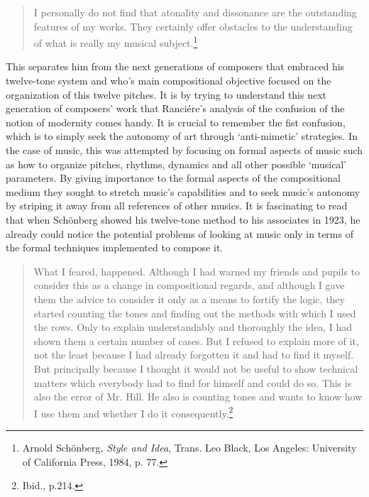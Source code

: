 \begin{quote}
I personally do not find that atonality and dissonance are the outstanding features of my works. They certainly offer obstacles to the understanding of what is really my musical subject.\footnote{Arnold Sch\"{o}nberg, \emph{Style and Idea}, Trans. Leo Black, Los Angeles: University of California Press, 1984, p. 77.}
\end{quote}
This separates him from the next generations of composers that embraced his twelve-tone system and who's main compositional objective focused on the organization of this twelve pitches. It is by trying to understand this next generation of composers' work that Ranci\'{e}re's analysis of the confusion of the notion of modernity comes handy. It is crucial to remember the fist confusion, which is to simply seek the autonomy of art through `anti-mimetic' strategies. In the case of music, this was attempted by focusing on formal aspects of music such as how to organize pitches, rhythms, dynamics and all other possible `musical' parameters. By giving importance to the formal aspects of the compositional medium they sought to stretch music's capabilities and to seek music's autonomy by striping it away from all references of other musics. It is fascinating to read that when Sch\"{o}nberg showed his twelve-tone method to his associates in 1923, he already could notice the potential problems of looking at music only in terms of the formal techniques implemented to compose it. 
\begin{quote}
What I feared, happened. Although I had warned my friends and pupils to consider this as a change in compositional regards, and although I gave them the advice to consider it only as a means to fortify the logic, they started counting the tones and finding out the methods with which I used the rows. Only to explain understandably and thoroughly the idea, I had shown them a certain number of cases. But I refused to explain more of it, not the least because I had already forgotten it and had to find it myself. But principally because I thought it would not be useful to show technical matters which everybody had to find for himself and could do so. This is also the error of Mr. Hill. He also is counting tones and wants to know how I use them and whether I do it consequently.\footnote{Ibid., p.214.} 
\end{quote}

